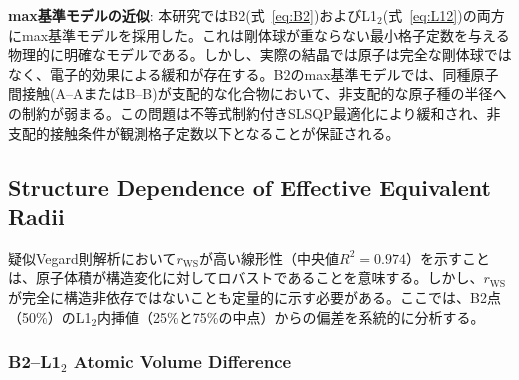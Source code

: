\documentclass[a4paper,10pt,5p]{elsarticle}
\begin{document}
\textbf{max基準モデルの近似}: 本研究ではB2(式~\ref{eq:B2})およびL1$_2$(式~\ref{eq:L12})の両方にmax基準モデルを採用した。これは剛体球が重ならない最小格子定数を与える物理的に明確なモデルである。しかし、実際の結晶では原子は完全な剛体球ではなく、電子的効果による緩和が存在する。B2のmax基準モデルでは、同種原子間接触(A--AまたはB--B)が支配的な化合物において、非支配的な原子種の半径への制約が弱まる。この問題は不等式制約付きSLSQP最適化により緩和され、非支配的接触条件が観測格子定数以下となることが保証される。







\subsection{Structure Dependence of Effective Equivalent Radii}

疑似Vegard則解析において$r_\mathrm{WS}$が高い線形性（中央値$R^2 = 0.974$）を示すことは、原子体積が構造変化に対してロバストであることを意味する。しかし、$r_\mathrm{WS}$が完全に構造非依存ではないことも定量的に示す必要がある。ここでは、B2点（50\%）のL1$_2$内挿値（25\%と75\%の中点）からの偏差を系統的に分析する。

\subsubsection{B2--L1$_2$ Atomic Volume Difference}
\end{document}
